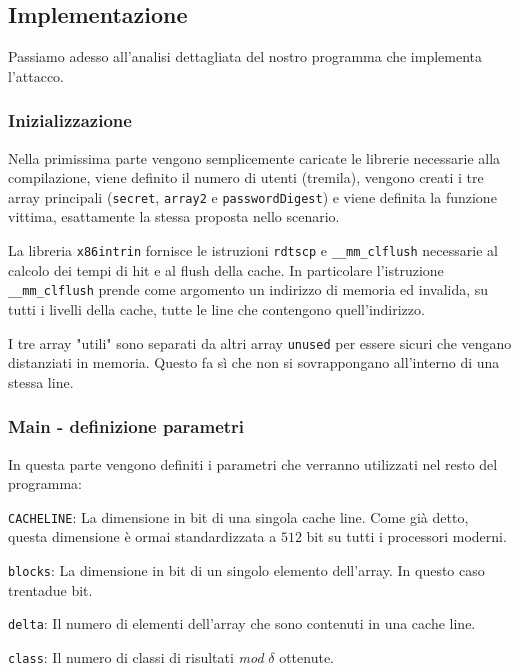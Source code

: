 			\subsection{Implementazione}
				Passiamo adesso all'analisi dettagliata del nostro programma che implementa l'attacco.
				
				\subsubsection{Inizializzazione}
				
				Nella primissima parte vengono semplicemente caricate le librerie necessarie alla compilazione, viene definito il numero di utenti (tremila), vengono creati i tre array principali (\texttt{secret}, \texttt{array2} e \texttt{passwordDigest}) e viene definita la funzione vittima, esattamente la stessa proposta nello scenario.
				
 				La libreria \texttt{x86intrin} fornisce le istruzioni \texttt{rdtscp} e \texttt{\_\_mm\_clflush} necessarie al calcolo dei tempi di hit e al flush della cache. In particolare l'istruzione \texttt{\_\_mm\_clflush} prende come argomento un indirizzo di memoria ed invalida, su tutti i livelli della cache, tutte le line che contengono quell'indirizzo.
				
				I tre array "utili" sono separati da altri array \texttt{unused} per essere sicuri che vengano distanziati in memoria. Questo fa sì che non si sovrappongano all'interno di una stessa line.
				
				\subsubsection{Main - definizione parametri}
				
				In questa parte vengono definiti i parametri che verranno utilizzati nel resto del programma:

					\texttt{CACHELINE}: La dimensione in bit di una singola cache line. Come già detto, questa dimensione è ormai standardizzata a $512$ bit su tutti i processori moderni.
					
					\texttt{blocks}: La dimensione in bit di un singolo elemento dell'array. In questo caso trentadue bit.
					
					\texttt{delta}: Il numero di elementi dell'array che sono contenuti in una cache line.
					
					\texttt{class}: Il numero di classi di risultati \emph{mod} $\delta$ ottenute.
					
